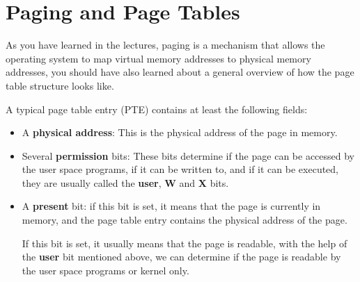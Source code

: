 \section{Paging and Page Tables}

As you have learned in the lectures, paging is a mechanism that allows the
operating system to map virtual memory addresses to physical memory addresses,
you should have also learned about a general overview of how the page table
structure looks like.

A typical page table entry (PTE) contains at least the following fields:

\begin{itemize}
    \item A \textbf{physical address}: This is the physical address of the page
          in memory.

    \item Several \textbf{permission} bits: These bits determine if the page
          can be accessed by the user space programs, if it can be written to,
          and if it can be executed, they are usually called the \textbf{user},
          \textbf{W} and \textbf{X} bits.


    \item A \textbf{present} bit: if this bit is set, it means that the page
          is currently in memory, and the page table entry contains the physical
          address of the page.

          If this bit is set, it usually means that the page is readable, with
          the help of the \textbf{user} bit mentioned above, we can determine
          if the page is readable by the user space programs or kernel only.

\end{itemize}

